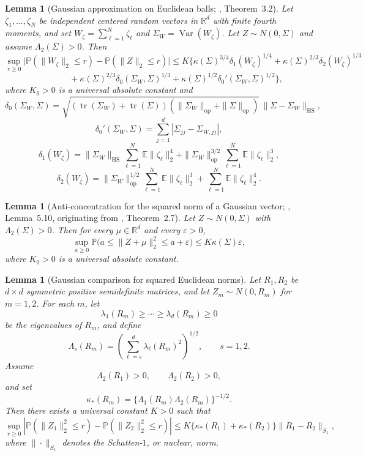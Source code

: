 \documentclass[
  12pt]{article}
\theoremstyle{plain}
\newtheorem{lemma}[theorem]{Lemma}
\theoremstyle{definition}
\theoremstyle{remark}
\begin{document}
\begin{lemma}[Gaussian approximation on Euclidean balls; \citealp{fang_large-dimensional_2021}, Theorem~3.2]
\label{lem:fang_koike_balls}
Let \(\zeta_1,\ldots,\zeta_N\) be independent centered random vectors in
\(\mathbb R^d\) with finite fourth moments, and set
\(W_\zeta=\sum_{\ell=1}^N\zeta_\ell\) and
\(\Sigma_W=\operatorname{Var}(W_\zeta)\). Let \(Z\sim N(0,\Sigma)\) and assume
\(\Lambda_2(\Sigma)>0\). Then
\[
\sup_{r\ge 0}
\bigl|
\mathbb P(\|W_\zeta\|_2\le r)
-\mathbb P(\|Z\|_2\le r)
\bigr|
\le
K\bigl\{
\kappa(\Sigma)^{3/4}\delta_1(W_\zeta)^{1/4}
+\kappa(\Sigma)^{2/3}\delta_2(W_\zeta)^{1/3}
\]
\[
\qquad\qquad
+\kappa(\Sigma)^{2/3}\delta_0(\Sigma_W,\Sigma)^{1/3}
+\kappa(\Sigma)^{1/2}\delta_0'(\Sigma_W,\Sigma)^{1/2}
\bigr\},
\]
where \(K_0>0\) is a universal absolute constant and
\[
\delta_0(\Sigma_W,\Sigma)
=
\sqrt{
(\operatorname{tr}(\Sigma_W)+\operatorname{tr}(\Sigma))
(\|\Sigma_W\|_{\mathrm{op}}+\|\Sigma\|_{\mathrm{op}})
}\,
\|\Sigma-\Sigma_W\|_{\mathrm{HS}},
\]
\[
\delta_0'(\Sigma_W,\Sigma)
=
\sum_{j=1}^d|\Sigma_{jj}-\Sigma_{W,jj}|,
\]
\[
\delta_1(W_\zeta)
=
\|\Sigma_W\|_{\mathrm{HS}}\sum_{\ell=1}^N\mathbb E\|\zeta_\ell\|_2^4
+
\|\Sigma_W\|_{\mathrm{op}}^{3/2}\sum_{\ell=1}^N\mathbb E\|\zeta_\ell\|_2^3,
\]
\[
\delta_2(W_\zeta)
=
\|\Sigma_W\|_{\mathrm{op}}^{1/2}\sum_{\ell=1}^N\mathbb E\|\zeta_\ell\|_2^3
+
\sum_{\ell=1}^N\mathbb E\|\zeta_\ell\|_2^4.
\]
\end{lemma}

\begin{lemma}[Anti-concentration for the squared norm of a Gaussian vector;
\citealp{fang_large-dimensional_2021}, Lemma~5.10, originating from
\citealp{gotze_large_2019}, Theorem~2.7]
\label{lem:gaussian_anticoncentration}
Let \(Z\sim N(0,\Sigma)\) with \(\Lambda_2(\Sigma)>0\). Then for every
\(\mu\in\mathbb R^d\) and every \(\varepsilon>0\),
\[
\sup_{a\ge 0}
\mathbb P\bigl(a\le \|Z+\mu\|_2^2\le a+\varepsilon\bigr)
\le
K\kappa(\Sigma)\varepsilon,
\]
where \(K_0>0\) is a universal absolute constant.
\end{lemma}

\begin{lemma}[Gaussian comparison for squared Euclidean norms]
\label{lem:gaussian_comparison_quadratic}
Let \(R_1,R_2\) be \(d\times d\) symmetric positive semidefinite matrices,
and let \(Z_m\sim N(0,R_m)\) for \(m=1,2\).  For each \(m\), let
\[
\lambda_1(R_m)\ge\cdots\ge\lambda_d(R_m)\ge0
\]
be the eigenvalues of \(R_m\), and define
\[
\Lambda_s(R_m)
=
\left(\sum_{\ell=s}^d\lambda_\ell(R_m)^2\right)^{1/2},
\qquad s=1,2.
\]
Assume
\[
\Lambda_2(R_1)>0,
\qquad
\Lambda_2(R_2)>0,
\]
and set
\[
\kappa_*(R_m)
=
\{\Lambda_1(R_m)\Lambda_2(R_m)\}^{-1/2}.
\]
Then there exists a universal constant \(K>0\) such that
\[
\sup_{r\ge0}
\left|
\mathbb P(\|Z_1\|_2^2\le r)
-
\mathbb P(\|Z_2\|_2^2\le r)
\right|
\le
K\{\kappa_*(R_1)+\kappa_*(R_2)\}
\|R_1-R_2\|_{S_1},
\]
where \(\|\cdot\|_{S_1}\) denotes the Schatten-\(1\), or nuclear, norm.
\end{lemma}
\end{document}
